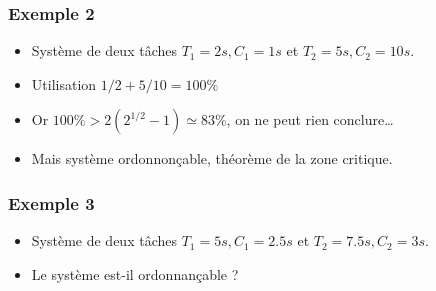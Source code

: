 \documentclass[ignorenonframetext,]{beamer}
\begin{document}
\begin{frame}\frametitle{Exemple 2}

\begin{itemize}
\item
  Système de deux tâches $T_1 = 2s, C_1 = 1s$ et $T_2 = 5s , C_2=10s$.
\item
  Utilisation $1/2 + 5/10 = 100 \%$
\item
  Or $100\% > 2(2^{1/2} - 1) \simeq 83\%$, on ne peut rien
  conclure\ldots{}
\end{itemize}

\begin{center}

\begin{RTGrid}[width=6cm]{2}{20}






\end{RTGrid}

\end{center}

\begin{itemize}
\item
  Mais système ordonnonçable, théorème de la zone critique.
\end{itemize}

\end{frame}

\begin{frame}\frametitle{Exemple 3}

\begin{itemize}
\item
  Système de deux tâches $T_1 = 5s, C_1 = 2.5s$ et
  $T_2 = 7.5s , C_2=3s$.
\item
  Le système est-il ordonnançable ?
\end{itemize}

\end{frame}
\end{document}
